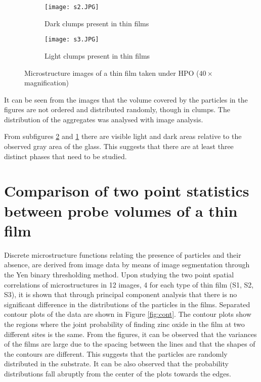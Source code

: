 \begin{figure}
  \centering
  \begin{subfigure}{.4\textwidth}
    \centering
    \texttt{[image: s2.JPG]}
    \caption{Dark clumps present in thin films}
    \label{fig:dark}
  \end{subfigure}
  \begin{subfigure}{.4\textwidth}
    \centering
    \texttt{[image: s3.JPG]}
    \caption{Light clumps present in thin films}
    \label{fig:light}
  \end{subfigure}
  \caption[HPO images of thin films]{Microstructure images of a thin film taken under HPO ($40\times$ magnification)}
  \label{fig:hpo}
\end{figure}

It can be seen from the images that the volume covered by the particles in the figures are not ordered and distributed randomly, though in clumps.
The distribution of the aggregates was analysed with image analysis.

From subfigures \ref{fig:light} and \ref{fig:dark} there are visible light and dark areas relative to the observed gray area of the glass.
This suggests that there are at least three distinct phases that need to be studied.

\section[Comparison of spatial correlations]{Comparison of two point statistics between probe volumes of a thin film}

Discrete microstructure functions relating the presence of particles and their absence, are derived from image data by means of image segmentation through the Yen binary thresholding method.
Upon studying the two point spatial correlations of microstructures in 12 images, 4 for each type of thin film (S1, S2, S3), it is shown that through principal component analysis that there is no significant difference in the distributions of the particles in the films. Separated contour plots of the data are shown in Figure \ref{fig:cont}.
The contour plots show the regions where the joint probability of finding zinc oxide in the film at two different sites is the same.
From the figures, it can be observed that the variances of the films are large due to the spacing between the lines and that the shapes of the contours are different.
This suggests that the particles are randomly distributed in the substrate. 
It can be also observed that the probability distributions fall abruptly from the center of the plots towards the edges.

